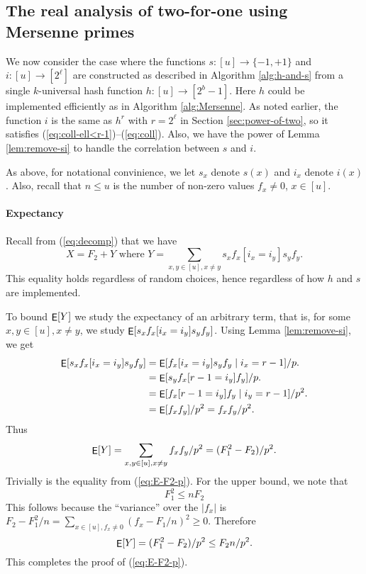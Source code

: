 \documentclass[12pt]{article}
\newcommand{\suchthat}{\mathrel{}\mathclose{}\ifnum\currentgrouptype=16\middle\fi\vert\mathopen{}\mathrel{}}
\DeclareMathOperator*{\E}{\sf{E}}
\newcommand{\req}[1]{(\ref{#1})}
\newcommand\fct\rightarrow
\begin{document}
\subsection{The real analysis of two-for-one using Mersenne primes}
We now consider the case where the functions $s:[u]\fct\{-1,+1\}$ and
$i:[u]\fct[2^\ell]$ are constructed as described in Algorithm
\ref{alg:h-and-s} from a single $k$-universal hash function
$h:[u]\fct[2^b-1]$. Here $h$ could be implemented efficiently as
in Algorithm \ref{alg:Mersenne}. As noted earlier, the function
$i$ is the same as $h^r$ with $r=2^\ell$ in Section \ref{sec:power-of-two},
so it satisfies \req{eq:coll-ell<r-1}--\req{eq:coll}. Also, we
have the power of Lemma \ref{lem:remove-si} to handle the correlation
between $s$ and $i$.

As above, for notational convinience, we let $s_x$ denote $s(x)$ and $i_x$ denote $i(x)$. Also, recall that $n\leq u$ is the number of non-zero values
$f_x\neq 0$, $x\in [u]$.



\paragraph{Expectancy}
Recall from \req{eq:decomp} that
we have
\[X=F_2+Y\mbox{ where }Y=\sum_{x,y\in[u],x\neq y} s_x f_x[i_x=i_y]s_y f_y.\]
This equality holds regardless of random choices, hence regardless of
how $h$ and $s$ are implemented.

To bound $\E[Y]$ we study the expectancy of an arbitrary term, that is,
for some $x,y\in[u],x\neq y$, we study $\E[ s_x f_x[i_x=i_y]s_y f_y]$.
Using Lemma \ref{lem:remove-si}, we get 
\begin{align}
\E[s_x f_x[i_x=i_y]s_y f_y]&=\E[f_x[i_x=i_y]s_y f_y\suchthat i_x=r-1]/p.\nonumber\\
&=\E[s_y f_x[r-1=i_y]f_y]/p.\nonumber\\
&=\E[f_x[r-1=i_y]f_y\suchthat i_y=r-1]/p^2.\nonumber\\
&=\E[f_xf_y]/p^2=f_x f_y/p^2.\label{eq:E}
\end{align}
Thus
\[\E[Y]=\sum_{x,y\in[u],x\neq y} f_xf_y/p^2=(F_1^2-F_2)/p^2.\]
Trivially is the equality from \req{eq:E-F2-p}. For the upper bound, we note that 
\begin{equation}\label{eq:F1F2}
F_1^2\leq nF_2 
\end{equation}
This follows because the ``variance'' over the $|f_x|$ is
$F_2-F_1^2/n=\sum_{x\in[u], f_x\neq 0}(f_x-F_1/n)^2\geq 0$.
Therefore
\[\E[Y]=(F_1^2-F_2)/p^2\leq F_2n/p^2.\]
This completes the proof of \req{eq:E-F2-p}.
\end{document}

